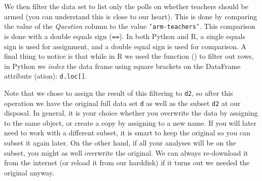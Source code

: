 We then filter the data set to list only the polls on whether teachers should be armed
(you can understand this is close to our heart).
This is done by comparing the value of the \emph{Question} column to the value \texttt{'arm-teachers'}.
This comparison is done with a double equals sign (\verb+==+).
In both Python and R, a single equals sign is used for assignment,
and a double equal sign is used for comparison.
A final thing to notice is that while in R we used the  function () to filter out rows,
in Python we \emph{index} the data frame using square brackets on the  DataFrame attribute (ation): \verb+d.loc[]+.

Note that we chose to assign the result of this filtering to \texttt{d2},
so after this operation we have the original full data set \texttt{d} as well as the subset \texttt{d2} at our disposal.
In general, it is your choice whether you overwrite the data by assigning to the same object,
or create a copy by assigning to a new name.
If you will later need to work with a different subset, it is smart to keep the original so you can subset it again later.
On the other hand, if all your analyses will be on the subset, you might as well overwrite the original.
We can always re-download it from the internet (or reload it from our harddisk) if it turns out we needed the original anyway. 



